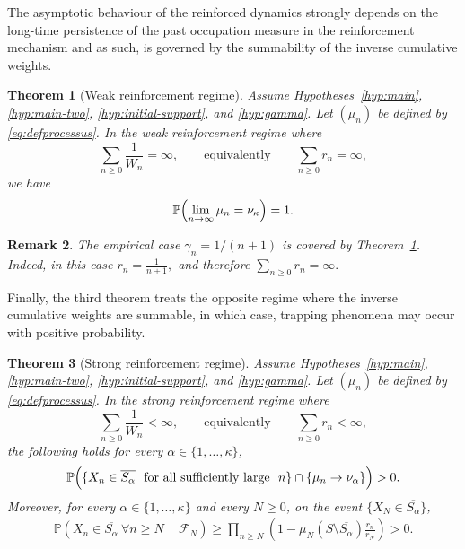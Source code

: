 \documentclass[10pt,letterpaper]{article}
\theoremstyle{compactplain}
\newtheorem{theorem}{Theorem}
\theoremstyle{compactdefinition}
\newtheorem{remark}[theorem]{Remark}
\newcommand{\1}{\mathds{1}}
\begin{document}
\medskip

The asymptotic behaviour of the reinforced dynamics strongly depends on the
long-time persistence of the past occupation measure in the reinforcement
mechanism and as such, is governed by the
summability of the inverse cumulative weights. 



\begin{theorem}[Weak reinforcement regime]
\label{th:weak-regime}
Assume Hypotheses~\ref{hyp:main}, \ref{hyp:main-two},
\ref{hyp:initial-support}, and \ref{hyp:gamma}. Let \((\mu_n)\) be defined by
\eqref{eq:defprocessus}. In the weak reinforcement regime where
 \begin{equation}\label{eq:sum-rn=infty}
         \sum_{n\geq0}\frac1{W_n}=\infty,
    \qquad\text{equivalently}\qquad
    \sum_{n\geq0}r_n=\infty,
    \end{equation}
we have
\[
\mathbb P\Bigl(\lim_{n\to\infty}\mu_n=\nu_\kappa\Bigr)=1.
\]
\end{theorem}
\begin{remark}
The empirical case \(\gamma_n=1/(n+1)\) is covered by Theorem~\ref{th:weak-regime}. Indeed, in this case
\(
r_n
=
\frac1{n+1},
\)
and therefore  $\sum_{n\geq0}r_n = \infty.$
\end{remark}
Finally, the third theorem treats the opposite regime where the inverse cumulative weights are summable, in which case, trapping phenomena may occur with positive probability.




\begin{theorem}[Strong reinforcement regime]
\label{thm:strong-regime}
Assume Hypotheses~\ref{hyp:main}, \ref{hyp:main-two},
\ref{hyp:initial-support}, and \ref{hyp:gamma}. Let \((\mu_n)\) be defined by
\eqref{eq:defprocessus}. In the strong reinforcement regime where
  \begin{equation}\label{eq:sum-rn-finite}
    \sum_{n\geq0}\frac1{W_n}<\infty,
    \qquad\text{equivalently}\qquad
    \sum_{n\geq0}r_n<\infty,
    \end{equation}
the following holds for every \(\alpha\in\{1,\ldots,\kappa\}\),
\[
\mathbb P\Bigl(
\{X_n\in \overline{S_\alpha} \ \text{ for all sufficiently large } \ n\}
 \cap 
\{\mu_n\to \nu_\alpha\}
\Bigr)>0.
\]
Moreover, for every \(\alpha\in\{1,\ldots,\kappa\}\) and every \(N\geq0\), on
the event \(\{X_N\in \overline{S_\alpha}\}\),
\begin{align}\label{eq:closed-trapping-lb}
   \mathbb P\left(
X_n\in \overline{S_\alpha}\ \forall n\geq N
\,\middle|\,
\mathcal F_N
\right)
\geq
\prod_{n\geq N}
\left(
1-\mu_N(S\setminus \overline{S_\alpha})\frac{r_n}{r_N}
\right)>0. 
\end{align}
\end{theorem}
\end{document}
